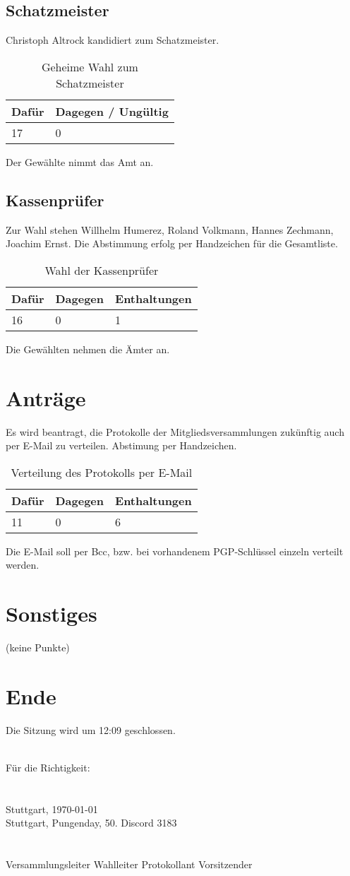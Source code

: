 \documentclass[a4paper]{scrartcl}
\begin{document}
\subsection{Schatzmeister}
Christoph Altrock kandidiert zum Schatzmeister.
\begin{table}[H]
	\begin{tabularx}{\textwidth}{XX}
		Dafür & Dagegen / Ungültig\\
		\toprule
		17 & 0\\
	\end{tabularx}
	\caption{Geheime Wahl zum Schatzmeister}
\end{table}
Der Gewählte nimmt das Amt an.
\subsection{Kassenprüfer}
Zur Wahl stehen Willhelm Humerez, Roland Volkmann, Hannes Zechmann, Joachim Ernst. Die Abstimmung erfolg per Handzeichen für die Gesamtliste.
\begin{table}[H]
	\begin{tabularx}{\textwidth}{XXX}
		Dafür & Dagegen & Enthaltungen\\
		\toprule
		16 & 0 & 1\\
	\end{tabularx}
	\caption{Wahl der Kassenprüfer}
\end{table}
Die Gewählten nehmen die Ämter an.
\clearpage
\section{Anträge}
Es wird beantragt, die Protokolle der Mitgliedsversammlungen zukünftig auch per E-Mail zu verteilen. Abstimung per Handzeichen.\\
\begin{table}[H]
	\begin{tabularx}{\textwidth}{XXX}
		Dafür & Dagegen & Enthaltungen\\
		\toprule
		11 & 0 & 6\\
	\end{tabularx}
	\caption{Verteilung des Protokolls per E-Mail}
\end{table}
Die E-Mail soll per Bcc, bzw. bei vorhandenem PGP-Schlüssel einzeln verteilt werden.

\section{Sonstiges}

(keine Punkte)\\

\section{Ende}

Die Sitzung wird um 12:09 geschlossen.

\vfill
\mbox{}\\
Für die Richtigkeit:\\
\\
\\
Stuttgart, \today\\
Stuttgart, Pungenday, 50. Discord 3183 \\
\\
\\
\hfill Versammlungsleiter \hfill Wahlleiter \hfill Protokollant \hfill Vorsitzender \hfill
\end{document}

